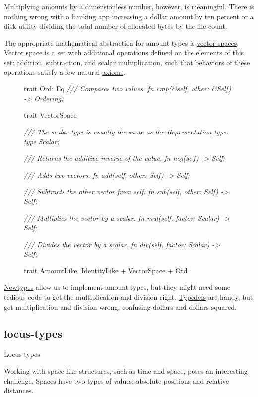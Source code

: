 \documentclass{article}
\begin{document}
Multiplying amounts by a dimensionless number, however, is meaningful.
There is nothing wrong with a banking app increasing a dollar amount by ten percent or a disk utility dividing the total number of allocated bytes by the file count.

The appropriate mathematical abstraction for amount types is \href{https://en.wikipedia.org/wiki/Vector_space}{vector spaces}.
Vector space is a set with additional operations defined on the elements of this set: addition, subtraction, and scalar multiplication, such that behaviors of these operations satisfy a few natural \href{https://en.wikipedia.org/wiki/Vector_space#Definition_and_basic_properties}{axioms}.

\begin{figure}
\begin{code}
trait Ord: Eq {
  \em{/// Compares two values.}
  fn cmp(&self, other: &Self) -> Ordering;
}

trait VectorSpace {
  \em{/// The scalar type is usually the same as the \href{#representation-type}{Representation} type.}
  type Scalar;

  \em{/// Returns the additive inverse of the value.}
  fn neg(self) -> Self;
  
  \em{/// Adds two vectors.}
  fn add(self, other: Self) -> Self;

  \em{/// Subtracts the other vector from self.}
  fn sub(self, other: Self) -> Self;

  \em{/// Multiplies the vector by a scalar.}
  fn mul(self, factor: Scalar) -> Self;

  \em{/// Divides the vector by a scalar.}
  fn div(self, factor: Scalar) -> Self;
}

trait AmountLike: IdentityLike + VectorSpace + Ord {}
\end{code}
\end{figure}

\href{#newtypes}{Newtypes} allow us to implement amount types, but they might need some tedious code to get the multiplication and division right.
\href{#typdefs}{Typedefs} are handy, but get multiplication and division wrong, confusing dollars and dollars squared.

\subsection{locus-types}{Locus types}

Working with space-like structures, such as time and space, poses an interesting challenge.
Spaces have two types of values: absolute positions and relative distances.
\end{document}
